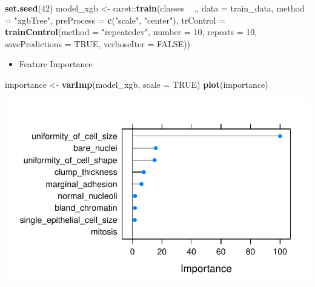 \documentclass[]{article}
\newenvironment{Shaded}{\begin{snugshade}}{\end{snugshade}}
\newcommand{\KeywordTok}[1]{\textcolor[rgb]{0.13,0.29,0.53}{\textbf{{#1}}}}
\newcommand{\DataTypeTok}[1]{\textcolor[rgb]{0.13,0.29,0.53}{{#1}}}
\newcommand{\DecValTok}[1]{\textcolor[rgb]{0.00,0.00,0.81}{{#1}}}
\newcommand{\StringTok}[1]{\textcolor[rgb]{0.31,0.60,0.02}{{#1}}}
\newcommand{\OtherTok}[1]{\textcolor[rgb]{0.56,0.35,0.01}{{#1}}}
\newcommand{\NormalTok}[1]{{#1}}
\providecommand{\tightlist}{%
  \setlength{\itemsep}{0pt}\setlength{\parskip}{0pt}}
\begin{document}
\begin{Shaded}
\begin{Highlighting}[]
\KeywordTok{set.seed}\NormalTok{(}\DecValTok{42}\NormalTok{)}
\NormalTok{model_xgb <-}\StringTok{ }\NormalTok{caret::}\KeywordTok{train}\NormalTok{(classes ~}\StringTok{ }\NormalTok{.,}
                          \DataTypeTok{data =} \NormalTok{train_data,}
                          \DataTypeTok{method =} \StringTok{"xgbTree"}\NormalTok{,}
                          \DataTypeTok{preProcess =} \KeywordTok{c}\NormalTok{(}\StringTok{"scale"}\NormalTok{, }\StringTok{"center"}\NormalTok{),}
                          \DataTypeTok{trControl =} \KeywordTok{trainControl}\NormalTok{(}\DataTypeTok{method =} \StringTok{"repeatedcv"}\NormalTok{, }
                                                  \DataTypeTok{number =} \DecValTok{10}\NormalTok{, }
                                                  \DataTypeTok{repeats =} \DecValTok{10}\NormalTok{, }
                                                  \DataTypeTok{savePredictions =} \OtherTok{TRUE}\NormalTok{, }
                                                  \DataTypeTok{verboseIter =} \OtherTok{FALSE}\NormalTok{))}
\end{Highlighting}
\end{Shaded}

\begin{itemize}
\tightlist
\item
  Feature Importance
\end{itemize}

\begin{Shaded}
\begin{Highlighting}[]
\NormalTok{importance <-}\StringTok{ }\KeywordTok{varImp}\NormalTok{(model_xgb, }\DataTypeTok{scale =} \OtherTok{TRUE}\NormalTok{)}
\KeywordTok{plot}\NormalTok{(importance)}
\end{Highlighting}
\end{Shaded}

\begin{center}\includegraphics{webinar_code_files/figure-latex/importance_xgb-1} \end{center}
\end{document}
